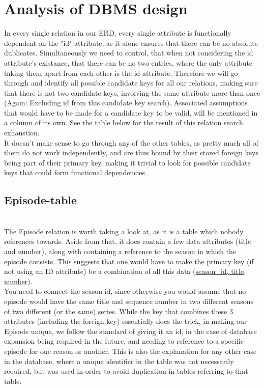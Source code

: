 \section{Analysis of DBMS design}
In every single relation in our ERD, every single attribute is functionally dependent on the "id" attribute, as it alone ensures that there can be no absolute dublicates. Simultaneously we need to control, that when not considering the id attribute's existance, that there can be no two entries, where the only attribute taking them apart from each other is the id attribute.
Therefore we will go through and identify all possible candidate keys for all our relations, making sure that there is not two candidate keys, involving the same attribute more than once (Again: Excluding id from this candidate key search). Associated assumptions that would have to be made for a candidate key to be valid, will be mentioned in a column of its own.
See the table below for the result of this relation search exhaustion.\\



It doesn't make sense to go through any of the other tables, as pretty much all of them do not work independently, and are thus bound by their stored foreign keys being part of their primary key, making it trivial to look for possible candidate keys that could form functional dependencies.

\subsection{Episode-table}\\\normalsize
The Episode relation is worth taking a look at, as it is a table which nobody references towards. Aside from that, it does contain a few data attributes (title and number), along with containing a reference to the season in which the episode consists. This suggests that one would have to make the primary key (if not using an ID attribute) be a combination of all this data
(\underline{season\_id, title, number}).\\
You need to connect the season id, since otherwise you would assume that no episode would have the same title and sequence number in two different seasons of two different (or the same) series. While the key that combines these 3 attributes (including the foreign key) essentially does the trick, in making our Episode unique, we follow the standard of giving it an id, in the case of database expansion being required in the future, and needing to reference to a specific episode for one reason or another.
This is also the explanation for any other case in the database, where a unique identifier in the table was not necessarily required, but was used in order to avoid duplication in tables referring to that table.